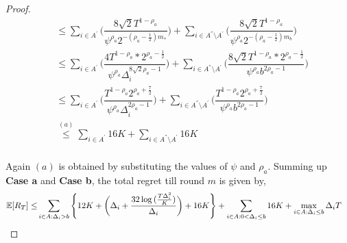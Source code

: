 \begin{proof}
\begin{align*}
&\leq\sum_{i\in A^{'}}\bigg(\dfrac{8\sqrt{2}T^{1-\rho_{a}}}{\psi^{\rho_{a}}2^{-(\rho_{a}-\frac{1}{2})m_{*}}} \bigg)+\sum_{i\in A^{''}\setminus A^{'}}\bigg(\dfrac{8\sqrt{2}T^{1-\rho_{a}}}{\psi^{\rho_{a}}2^{-(\rho_{a}-\frac{1}{2})m_{b}}} \bigg)\\
&\leq\sum_{i\in A^{'}}\bigg(\dfrac{4T^{1-\rho_{a}}*2^{\rho_{a}-\frac{1}{2}}}{\psi^{\rho_{a}}\Delta_{i}^{8\sqrt{2}\rho_{a}-1}} \bigg)+\sum_{i\in A^{''}\setminus A^{'}}\bigg(\dfrac{8\sqrt{2}T^{1-\rho_{a}}*2^{\rho_{a}-\frac{1}{2}}}{\psi^{\rho_{a}}b^{2\rho_{a}-1}} \bigg)\\
&\leq\sum_{i\in A^{'}}\bigg(\dfrac{T^{1-\rho_{a}}2^{\rho_{a}+\frac{7}{2}}}{\psi^{\rho_{a}}\Delta_{i}^{2\rho_{a}-1}} \bigg)+\sum_{i\in A^{''}\setminus A^{'}}\bigg(\dfrac{T^{1-\rho_{a}}2^{\rho_{a}+\frac{7}{2}}}{\psi^{\rho_{a}}b^{2\rho_{a}-1}} \bigg)\\
&\overset{(a)}{\leq}\sum_{i\in A^{'}}16K +\sum_{i\in A^{''}\setminus A^{'}} 16K\\
\end{align*}

Again $(a)$ is obtained by substituting the values of $\psi$ and $\rho_a$. Summing up \textbf{Case a} and \textbf{Case b}, the total regret till round $m$ is given by,
\begin{align*}
 \mathbb{E}[R_{T}] \leq &\sum\limits_{i\in A:\Delta_{i} > b} \left\lbrace 12K + \bigg(\Delta_{i}+\dfrac{32\log{(\frac{T\Delta_i^2}{K})}}{\Delta_{i}}\bigg) + 16K\right\rbrace +\sum\limits_{i\in A:0 < \Delta_{i}\leq b} 16K + \max_{i\in A:\Delta_{i}\leq b}\Delta_{i}T
\end{align*}
\end{proof}


